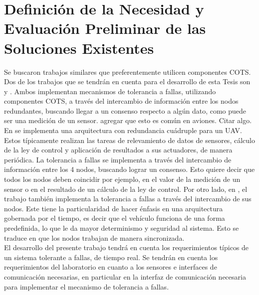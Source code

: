 \section{Definición de la Necesidad y Evaluación Preliminar de las Soluciones Existentes}




Se buscaron trabajos similares que preferentemente utilicen componentes COTS. Dos de los trabajos que se tendrán en cuenta para el desarrollo de esta Tesis son \cite{hiergeist2018implementation} y \cite{zhang2020architecture}. Ambos implementan mecanismos de tolerancia a fallas, utilizando componentes COTS, a través del intercambio de información entre los nodos redundantes, buscando llegar a un consenso respecto a algún dato, como puede ser una medición de un sensor. {\color{red} agregar que esto es común en aviones. Citar algo}. En \cite{hiergeist2018implementation} se implementa una arquitectura con redundancia cuádruple para un UAV. Estos típicamente realizan las tareas de relevamiento de datos de sensores, cálculo de la ley de control y aplicación de resultados a sus actuadores, de manera periódica. La tolerancia a fallas se implementa a través del intercambio de información entre los 4 nodos, buscando lograr un consenso. Esto quiere decir que todos los nodos deben coincidir por ejemplo, en el valor de la medición de un sensor o en el resultado de un cálculo de la ley de control. Por otro lado, en \cite{zhang2020architecture}, el trabajo también implementa la tolerancia a fallas a través del intercambio de sus nodos. Este tiene la particularidad de hacer énfasis en una arquitectura gobernada por el tiempo, es decir que el vehículo funciona de una forma predefinida, lo que le da mayor determinismo y seguridad al sistema. Esto se traduce en que los nodos trabajan de manera sincronizada.\\

El desarrollo del presente trabajo tendrá en cuenta los requerimientos típicos de un sistema tolerante a fallas, de tiempo real. Se tendrán en cuenta los requerimientos del laboratorio en cuanto a los sensores e interfaces de comunicación necesarias, en particular en la interfaz de comunicación necesaria para implementar el mecanismo de tolerancia a fallas.